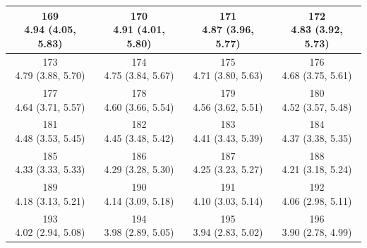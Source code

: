 \begin{table}[htbp]
\begin{tabular}{cccc}
\shortstack[c]{169\\4.94 (4.05, 5.83)} & \shortstack[c]{170\\4.91 (4.01, 5.80)} & \shortstack[c]{171\\4.87 (3.96, 5.77)} & \shortstack[c]{172\\4.83 (3.92, 5.73)} \\
\hline
\shortstack[c]{173\\4.79 (3.88, 5.70)} & \shortstack[c]{174\\4.75 (3.84, 5.67)} & \shortstack[c]{175\\4.71 (3.80, 5.63)} & \shortstack[c]{176\\4.68 (3.75, 5.61)} \\
\hline
\shortstack[c]{177\\4.64 (3.71, 5.57)} & \shortstack[c]{178\\4.60 (3.66, 5.54)} & \shortstack[c]{179\\4.56 (3.62, 5.51)} & \shortstack[c]{180\\4.52 (3.57, 5.48)} \\
\hline
\shortstack[c]{181\\4.48 (3.53, 5.45)} & \shortstack[c]{182\\4.45 (3.48, 5.42)} & \shortstack[c]{183\\4.41 (3.43, 5.39)} & \shortstack[c]{184\\4.37 (3.38, 5.35)} \\
\hline
\shortstack[c]{185\\4.33 (3.33, 5.33)} & \shortstack[c]{186\\4.29 (3.28, 5.30)} & \shortstack[c]{187\\4.25 (3.23, 5.27)} & \shortstack[c]{188\\4.21 (3.18, 5.24)} \\
\hline
\shortstack[c]{189\\4.18 (3.13, 5.21)} & \shortstack[c]{190\\4.14 (3.09, 5.18)} & \shortstack[c]{191\\4.10 (3.03, 5.14)} & \shortstack[c]{192\\4.06 (2.98, 5.11)} \\
\hline
\shortstack[c]{193\\4.02 (2.94, 5.08)} & \shortstack[c]{194\\3.98 (2.89, 5.05)} & \shortstack[c]{195\\3.94 (2.83, 5.02)} & \shortstack[c]{196\\3.90 (2.78, 4.99)} \\
\hline

\end{tabular}
\end{table}
